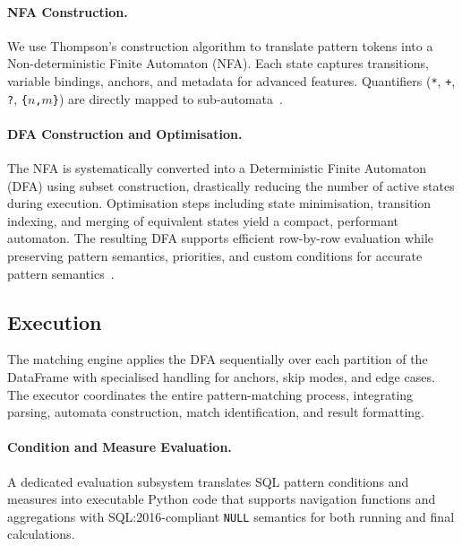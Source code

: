 \paragraph{NFA Construction.}
We use Thompson's construction algorithm to translate pattern
tokens into a Non-deterministic Finite Automaton (NFA).  Each
state captures transitions, variable bindings, anchors, and
metadata for advanced features.  Quantifiers (\texttt{*},
\texttt{+}, \texttt{?}, \texttt{\{$n$,$m$\}}) are directly
mapped to sub-automata~\cite{georgiou2025streaming}.

\paragraph{DFA Construction and Optimisation.}
The NFA is systematically converted into a Deterministic Finite
Automaton (DFA) using subset construction, drastically reducing
the number of active states during execution.  Optimisation steps
including state minimisation, transition indexing, and merging of
equivalent states yield a compact, performant automaton.  The
resulting DFA supports efficient row-by-row evaluation while
preserving pattern semantics, priorities, and custom conditions
for accurate pattern
semantics~\cite{e104-d_3_381,10.1145/986537.986588,georgiou2025streaming}.

\subsection{Execution}
\label{subsec:impl-execution}

The matching engine applies the DFA sequentially over each partition
of the DataFrame with specialised handling for anchors, skip modes,
and edge cases.  The executor coordinates the entire
pattern-matching process, integrating parsing, automata
construction, match identification, and result formatting.

\paragraph{Condition and Measure Evaluation.}
A dedicated evaluation subsystem translates SQL pattern conditions
and measures into executable Python code that supports navigation
functions and aggregations with SQL:2016-compliant \texttt{NULL}
semantics for both running and final calculations.

